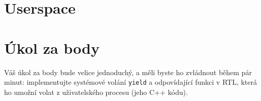 \documentclass{article}
\begin{document}
\section{Userspace}





\section{Úkol za body}

Váš úkol za body bude velice jednoduchý, a měli byste ho zvládnout během pár minut: implementujte systémové volání {\tt yield} a odpovídající funkci v RTL, která ho umožní volat z uživatelského procesu (jeho C++ kódu).
\end{document}
